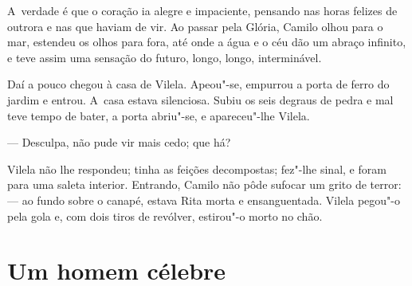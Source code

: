 \begin{linenumbers}
A~verdade é que o coração ia alegre e impaciente, pensando nas horas
felizes de outrora e nas que haviam de vir. Ao passar pela Glória,
Camilo olhou para o mar, estendeu os olhos para fora, até onde a água e
o céu dão um abraço infinito, e teve assim uma sensação do futuro,
longo, longo, interminável.

Daí a pouco chegou à casa de Vilela. Apeou"-se, empurrou a porta de ferro
do jardim e entrou. A~casa estava silenciosa. Subiu os seis degraus de
pedra e mal teve tempo de bater, a porta abriu"-se, e apareceu"-lhe
Vilela.

--- Desculpa, não pude vir mais cedo; que há?

Vilela não lhe respondeu; tinha as feições decompostas; fez"-lhe sinal, e
foram para uma saleta interior. Entrando, Camilo não pôde sufocar um
grito de terror: --- ao fundo sobre o canapé, estava Rita morta e
ensanguentada. Vilela pegou"-o pela gola e, com dois tiros de revólver,
estirou"-o morto no chão.

\end{linenumbers}

\chapter{Um homem célebre}

